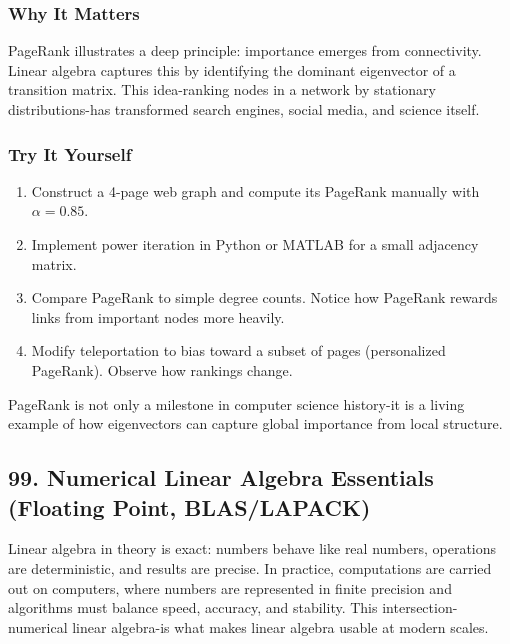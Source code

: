 \documentclass[
  letterpaper,
  DIV=11,
  numbers=noendperiod]{scrreprt}
\providecommand{\tightlist}{%
  \setlength{\itemsep}{0pt}\setlength{\parskip}{0pt}}
\begin{document}
\subsubsection{Why It Matters}\label{why-it-matters-93}

PageRank illustrates a deep principle: importance emerges from
connectivity. Linear algebra captures this by identifying the dominant
eigenvector of a transition matrix. This idea-ranking nodes in a network
by stationary distributions-has transformed search engines, social
media, and science itself.

\subsubsection{Try It Yourself}\label{try-it-yourself-97}

\begin{enumerate}
\def\labelenumi{\arabic{enumi}.}
\tightlist
\item
  Construct a 4-page web graph and compute its PageRank manually with
  \(\alpha = 0.85\).
\item
  Implement power iteration in Python or MATLAB for a small adjacency
  matrix.
\item
  Compare PageRank to simple degree counts. Notice how PageRank rewards
  links from important nodes more heavily.
\item
  Modify teleportation to bias toward a subset of pages (personalized
  PageRank). Observe how rankings change.
\end{enumerate}

PageRank is not only a milestone in computer science history-it is a
living example of how eigenvectors can capture global importance from
local structure.

\subsection{99. Numerical Linear Algebra Essentials (Floating Point,
BLAS/LAPACK)}\label{numerical-linear-algebra-essentials-floating-point-blaslapack}

Linear algebra in theory is exact: numbers behave like real numbers,
operations are deterministic, and results are precise. In practice,
computations are carried out on computers, where numbers are represented
in finite precision and algorithms must balance speed, accuracy, and
stability. This intersection-numerical linear algebra-is what makes
linear algebra usable at modern scales.
\end{document}
